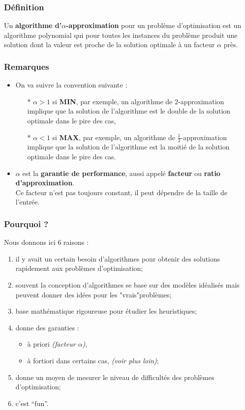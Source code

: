 \documentclass[12pt]{article}
\begin{document}
\subsubsection*{Définition}
Un \textbf{algorithme d'$\alpha$-approximation} pour un problème d'optimisation
est un algorithme polynomial qui \indent pour toutes les instances du problème
produit une solution dont la valeur est proche de la solution optimale \indent
à un facteur $\alpha$ près.

\subsubsection*{Remarques}
\begin{itemize}
\item On va suivre la convention suivante :
\begin{itemize}
\item[*]$\boxed{\alpha > 1}$ si \textbf{MIN}, par exemple, un algorithme de
$2$-approximation implique que la solution de l'algorithme est le double de
la solution optimale dans le pire des cas,
\item[*]$\boxed{\alpha < 1}$ si \textbf{MAX}, par exemple, un algorithme de
$\frac{1}{2}$-approximation implique que la solution de l'algorithme est la
moitié de la solution optimale dans le pire des cas.
\end{itemize}
\item $\alpha$ est la \textbf{garantie de performance}, aussi appelé
\textbf{facteur} ou \textbf{ratio d'approximation}.\\
Ce facteur n'est pas toujours constant, il peut dépendre de la taille de
l'entrée.
\end{itemize}

\subsubsection*{Pourquoi ?}
Nous donnons ici 6 raisons :
\begin{enumerate}
\item il y avait un certain besoin d'algorithmes pour obtenir des solutions
rapidement aux problèmes d'optimisation;
\item souvent la conception d'algorithmes se base sur des modèles idéalisés mais
peuvent donner des idées pour les "vrais"problèmes;
\item base mathématique rigoureuse pour étudier les heuristiques;
\item donne des garanties :
\begin{itemize}
\item à priori \textit{(facteur $\alpha$)},
\item à fortiori dans certains cas, \textit{(voir plus loin)};
\end{itemize}
\item donne un moyen de mesurer le niveau de difficultés des problèmes
d'optimisation;
\item c'est ``fun''.
\end{enumerate}
\end{document}
